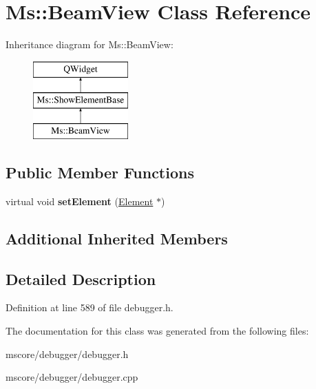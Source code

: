 \hypertarget{class_ms_1_1_beam_view}{}\section{Ms\+:\+:Beam\+View Class Reference}
\label{class_ms_1_1_beam_view}
Inheritance diagram for Ms\+:\+:Beam\+View\+:\begin{figure}[H]
\begin{center}
\leavevmode
\includegraphics[height=3.000000cm]{class_ms_1_1_beam_view}
\end{center}
\end{figure}
\subsection*{Public Member Functions}
\begin{DoxyCompactItemize}
\item 
\mbox{\label{class_ms_1_1_beam_view_a56be51f1adfca09da08363db7a8bcce1}} 
virtual void {\bfseries set\+Element} (\hyperlink{class_ms_1_1_element}{Element} $\ast$)
\end{DoxyCompactItemize}
\subsection*{Additional Inherited Members}


\subsection{Detailed Description}


Definition at line 589 of file debugger.\+h.



The documentation for this class was generated from the following files\+:\begin{DoxyCompactItemize}
\item 
mscore/debugger/debugger.\+h\item 
mscore/debugger/debugger.\+cpp\end{DoxyCompactItemize}
